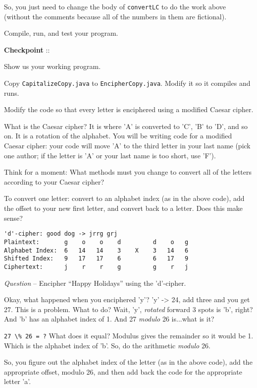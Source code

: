 \documentclass[12pt,oneside]{memoir}
\newcommand\code[1]{\lstinline^#1^}
\newcounter{LabPhase}
\newenvironment{LabExercises}{%
\renewcommand{\ExerciseListName}{Question}%
\renewcommand{\ExerciseListHeader}{\textbf{%
   Phase\ExerciseHeaderNB. }}
\begin{ExerciseList}}%
{\end{ExerciseList}}
\newcommand{\LabExercise}{\Exercise[name={Lab Phase\ExerciseHeaderNB},counter={LabPhase}]}
\newcounter{CheckPoint}
\newcommand{\Checkpoint}{\textbf{Checkpoint \theCheckPoint }:: \addtocounter{CheckPoint}{1}}
\newcounter{myQuestion}
\newcommand{\myQuestion}{\addtocounter{myQuestion}{1}\emph{Question \themyQuestion}-- }
\begin{document}
\begin{LabExercises}
  So, you just need to change the body of \code{convertLC} to do the
  work above (without the comments because all of the numbers in them
  are fictional). 

  Compile, run, and test your program.

  \Checkpoint Show us your working program.

  \LabExercise Copy \code{CapitalizeCopy.java} to
  \code{EncipherCopy.java}. Modify it so it compiles and runs.

  \LabExercise Modify the code so that every letter is enciphered
  using a modified Caesar cipher.

  What is the Caesar cipher? It is where 'A' is converted to 'C', 'B'
  to 'D', and so on. It is a rotation of the alphabet. You will be
  writing code for a modified Caesar cipher: your code will move 'A'
  to the third letter in your last name (pick one author; if the
  letter is 'A' or your last name is too short, use 'F').

  Think for a moment: What methods must you change to convert all of
  the letters according to your Caesar cipher?

  To convert one letter: convert to an alphabet index (as in the above
  code), add the offset to your new first letter, and convert back to
  a letter. Does this make sense?

  \begin{lstlisting}
'd'-cipher: good dog -> jrrg grj
Plaintext:       g    o    o    d         d    o   g
Alphabet Index:  6   14   14    3    X    3   14   6
Shifted Index:   9   17   17    6         6   17   9
Ciphertext:      j    r    r    g         g    r   j
  \end{lstlisting}

  \myQuestion Encipher ``Happy Holidays'' using the 'd'-cipher.

  Okay, what happened when you enciphered 'y'? 'y' -> 24, add three
  and you get 27. This is a problem. What to do? Wait, 'y',
  \emph{rotated} forward 3 spots is 'b', right? And 'b' has an
  alphabet index of 1. And 27 \emph{modulo} 26 is...what is it?

  \code{27 \% 26 = ?} What does it equal? Modulus gives the remainder
  so it would be 1. Which is the alphabet index of 'b'. So, do the
  arithmetic \emph{modulo} 26.

  So, you figure out the alphabet index of the letter (as in the above
  code), add the appropriate offset, modulo 26, and then add back the
  code for the appropriate letter 'a'.


\end{LabExercises}
\end{document}

